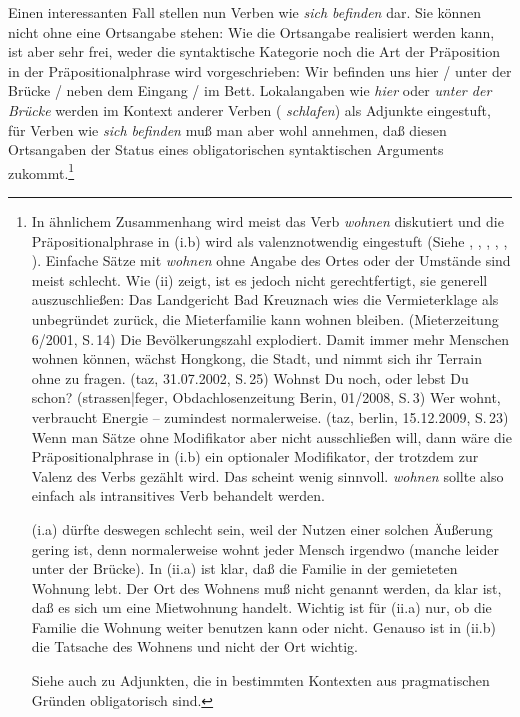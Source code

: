 \noindent
Einen interessanten Fall stellen nun Verben wie \emph{sich befinden} dar. Sie können
nicht ohne eine Ortsangabe stehen:
\z
Wie die Ortsangabe realisiert werden kann, ist aber sehr frei, weder die syntaktische
Kategorie noch die Art der Präposition %
in der Präpositionalphrase wird vorgeschrieben:
\ea
Wir befinden uns hier / unter der Brücke / neben dem Eingang / im Bett.
\z
Lokalangaben wie \emph{hier} oder \emph{unter der Brücke} werden im Kontext anderer Verben (\zb
\emph{schlafen}) als Adjunkte eingestuft, für Verben wie \emph{sich befinden} muß man aber wohl
annehmen, daß diesen Ortsangaben der Status eines obligatorischen syntaktischen Arguments zukommt.\footnote{
  In ähnlichem Zusammenhang wird meist das Verb \emph{wohnen} diskutiert und
  die Präpositionalphrase in (i.b) wird als valenznotwendig eingestuft 
  (Siehe \zb {}, , \citet[]{Bierwisch88a-u-kopiert}, , 
, ).
Einfache Sätze mit \emph{wohnen} ohne Angabe des Ortes oder der Umstände sind meist
        schlecht. 
\eal
{}
\zl
Wie (ii) zeigt, ist es jedoch nicht gerechtfertigt, sie generell auszuschließen:
        \eal
        \ex Das Landgericht Bad Kreuznach wies die Vermieterklage als unbegründet zurück,
            die Mieterfamilie kann wohnen bleiben. (Mieterzeitung 6/2001, S.\,14)
        \ex Die Bevölkerungszahl explodiert. Damit immer mehr Menschen wohnen können, wächst Hongkong, die Stadt, 
            und nimmt sich ihr Terrain ohne zu fragen.  (taz, 31.07.2002, S.\,25)
        \ex Wohnst Du noch, oder lebst Du schon? (strassen|feger, Obdachlosenzeitung Berin, 01/2008,
        S.\,3)%
\ex Wer wohnt, verbraucht Energie -- zumindest normalerweise. (taz, berlin, 15.12.2009, S.\,23)
        \zl
Wenn man Sätze ohne Modifikator aber nicht ausschließen will, dann wäre
die Präpositionalphrase in (i.b) ein optionaler Modifikator, der trotzdem
zur Valenz des Verbs gezählt wird. Das scheint wenig sinnvoll. \emph{wohnen}
sollte also einfach als intransitives Verb behandelt werden.

(i.a) dürfte deswegen schlecht sein, weil der Nutzen einer solchen Äußerung gering ist,
denn normalerweise wohnt jeder Mensch irgendwo (manche leider unter der Brücke).
In (ii.a) ist klar, daß die Familie in der gemieteten Wohnung lebt. Der Ort des Wohnens muß nicht
genannt werden, da klar ist, daß es sich um eine Mietwohnung handelt. Wichtig ist für (ii.a) nur, 
ob die Familie die Wohnung weiter benutzen kann oder nicht.
Genauso ist in (ii.b) die Tatsache des Wohnens und nicht der Ort wichtig.

Siehe auch  zu Adjunkten, die in bestimmten Kontexten aus pragmatischen 
Gründen obligatorisch sind.%
}

